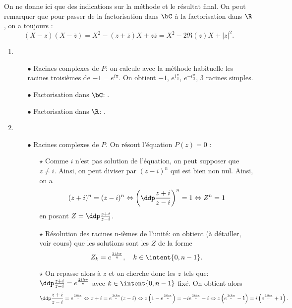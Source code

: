 \documentclass[a4paper, 11pt,reqno]{article}
\begin{document}
\begin{correction}  \;
	On ne donne ici que des indications sur la m\'ethode et le r\'esultat final. On peut remarquer que pour passer de la factorisation dans $\bC$ \`a la factorisation dans $\R$, on a toujours :
	$$(X-z)(X-\bar z) = X^2-(z+\bar z) X + z\bar z = X^2 -2\Re(z) X+ |z|^2.$$
	\begin{enumerate}
		\item
		      \begin{itemize}
			      \item[$\bullet$] Racines complexes de $P$:  on calcule avec la m\'ethode habituelle les racines troisi\`{e}mes de $-1=e^{i\pi}$. On obtient $-1$, $e^{i\frac{\pi}{3}}$, $e^{-i\frac{\pi}{3}}$, 3 racines simples.
			      \item[$\bullet$] Factorisation dans $\bC$: .
			      \item[$\bullet$] Factorisation dans $\R$: .
		      \end{itemize}
		\item
		      \begin{itemize}
			      \item[$\bullet$] Racines complexes de $P$. On r\'esout l'\'equation $P(z)=0$ :
			            \begin{itemize}
				            \item[$\star$] Comme $i$ n'est pas solution de l'\'equation, on peut supposer que $z\not= i$. Ainsi, on peut diviser par $(z-i)^n$ qui est bien non nul. Ainsi, on a
				                  $$(z+i)^n=(z-i)^n\Leftrightarrow \left( \ddp\frac{z+i}{z-i}\right)^n=1\Leftrightarrow Z^n=1$$
				                  en posant $Z=\ddp\frac{z+i}{z-i}$.
				            \item[$\star$] R\'esolution des racines n-i\`{e}mes de l'unit\'e: on obtient (\`a d\'etailler, voir cours) que les solutions sont les $Z$ de la forme
				                  $$Z_k=e^{\frac{2ik\pi}{n}},\quad k\in\intent{ 0,n-1}.$$
				            \item[$\star$] On repasse alors \`{a} $z$ et on cherche donc les $z$ tels que: $\ddp\frac{z+i}{z-i}=e^{\frac{2ik\pi}{n}}$ avec $k\in\intent{ 0,n-1}$ fix\'e. On obtient alors
				                  $$\ddp\frac{z+i}{z-i}=e^{\frac{2ik\pi}{n}}\Leftrightarrow z+i=e^{\frac{2ik\pi}{n}} (z-i)\Leftrightarrow z\left(1- e^{\frac{2ik\pi}{n}} \right)=-ie^{\frac{2ik\pi}{n}}-i\Leftrightarrow z\left(e^{\frac{2ik\pi}{n}} -1\right)=i\left( e^{\frac{2ik\pi}{n}}+1\right).$$

\end{itemize}
\end{itemize}
\end{enumerate}
\end{correction}
\end{document}

